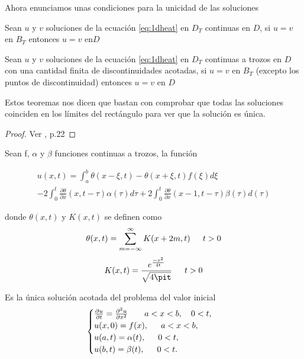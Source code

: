 Ahora enunciamos unas condiciones para la unicidad de las soluciones

\begin{teorema}[Unicidad]
	Sean $u$ y $v$ soluciones de la ecuación \ref{eq:1dheat} en $D_T$ continuas en $D$, si $u=v$ en $B_T$ entonces $u=v$ en$D$
\end{teorema}

\begin{teorema}
	Sean $u$ y $v$ soluciones de la ecuación \ref{eq:1dheat} en $D_T$ continuas a trozos en $D$ con una cantidad finita de discontinuidades acotadas, si $u=v$ en $B_T$ (excepto los puntos de discontinuidad) entonces $u=v$ en $D$
\end{teorema}

Estos teoremas nos dicen que bastan con comprobar que todas las soluciones coinciden en los límites del rectángulo para ver que la solución es única.

\begin{proof}
	Ver \citet{1dheat}, p.22
\end{proof}



\begin{teorema}\label{teo:exis_uni_1dheat}
	Sean f, $\alpha$ y $\beta$ funciones continuas a trozos, la función
	
	\begin{multline}\label{eq:sol1dheat}
		u(x,t) = \int_{a}^{b}\theta(x-\xi,t)-\theta(x+\xi,t)f(\xi)d\xi \\
		- 2\int_{0}^{t}\frac{\partial \theta}{\partial x}(x, t-\tau)\alpha(\tau)d\tau+2\int_{0}^{t}\frac{\partial\theta}{\partial x}(x-1,t-\tau)\beta(\tau)d(\tau)
	\end{multline}
	
	donde $\theta(x,t)$ y $K(x,t)$ se definen como
	\[
		\theta(x,t)=\sum_{m=-\infty}^{\infty}K(x+2m,t) \hspace{15px} t>0
	\]\[
		K(x,t)=\frac{e^{\frac{-x^2}{4t}}}{\sqrt{4\pit}}\hspace{15px} t>0
	\]
	
	Es la única solución acotada del problema del valor inicial
	\begin{equation}\label{eq:pvi1dheat}
		\begin{cases}
			\frac{\partial u}{\partial t} = \frac{\partial ^2u}{\partial x^2} \hspace{20px}a<x<b, \hspace{10px} 0<t, \\
			u(x,0)=f(x), \hspace{15px} a<x<b, \\
			u(a,t)=\alpha(t), \hspace{15px} 0<t, \\
			u(b,t)=\beta(t), \hspace{15px} 0<t.
		\end{cases}
	\end{equation}
	
\end{teorema}

